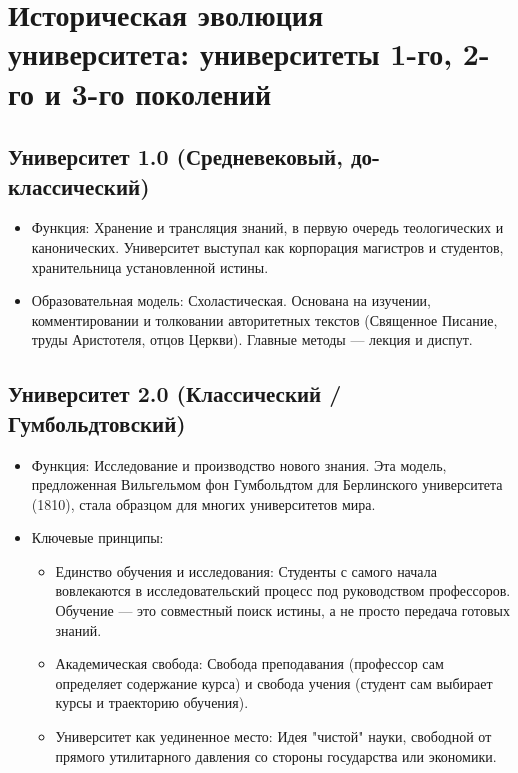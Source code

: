\documentclass[12pt,a4paper]{article}
\begin{document}
	\section{Историческая эволюция университета: университеты 1-го, 2-го и 3-го поколений~\checkmark}
	\subsection{Университет 1.0 (Средневековый, до-классический)}
	\begin{itemize}
		\item Функция: Хранение и трансляция знаний, в первую очередь теологических и канонических. Университет выступал как корпорация магистров и студентов, хранительница установленной истины.
		\item Образовательная модель: Схоластическая. Основана на изучении, комментировании и толковании авторитетных текстов (Священное Писание, труды Аристотеля, отцов Церкви). Главные методы --- лекция и диспут.
	\end{itemize}
	
	\subsection{Университет 2.0 (Классический / Гумбольдтовский)}
	\begin{itemize}
		\item Функция: Исследование и производство нового знания. Эта модель, предложенная Вильгельмом фон Гумбольдтом для Берлинского университета (1810), стала образцом для многих университетов мира.
		\item Ключевые принципы:
		\begin{itemize}
			\item Единство обучения и исследования: Студенты с самого начала вовлекаются в исследовательский процесс под руководством профессоров. Обучение --- это совместный поиск истины, а не просто передача готовых знаний.
			\item Академическая свобода: Свобода преподавания (профессор сам определяет содержание курса) и свобода учения (студент сам выбирает курсы и траекторию обучения).
			\item Университет как уединенное место: Идея "чистой" науки, свободной от прямого утилитарного давления со стороны государства или экономики.
		\end{itemize}
	\end{itemize}
	
\end{document}
